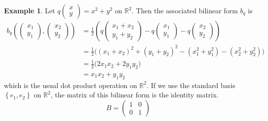 \documentclass[12pt]{article}
\theoremstyle{definition}
\newtheorem{example}[theorem]{Example}
\newcommand{\R}{\mathbb{R}}
\newcommand{\lp}{\left(}
\newcommand{\rp}{\right)}
\newcommand{\lb}{\left\{}
\newcommand{\rb}{\right\}}
\begin{document}
\begin{example}
Let $q \begin{pmatrix} x \\ y \end{pmatrix} = x^2+ y^2$ on $\R^2$. Then the associated bilinear form $b_q$ is
\begin{align*}
	b_q \lp
	\begin{pmatrix}
		x_1 \\
		y_1
	\end{pmatrix}
	,
	\begin{pmatrix}
		x_2 \\
		y_2
	\end{pmatrix}
	\rp  &= \frac 12 \lp
	q 
	\begin{pmatrix}
		x_1 + x_2 \\
		y_1 + y_2
	\end{pmatrix}
	-
	q 
	\begin{pmatrix}
		x_1 \\
		y_1
	\end{pmatrix} 
	-
	q 
	\begin{pmatrix}
		x_2 \\
		y_2
	\end{pmatrix}
	\rp \\
	&= \frac 12 \Big( (x_1+x_2)^2 + (y_1 + y_2)^2 - (x_1^2 + y_1^2) - (x_2^2 + y_2^2) \Big) \\
	&= \frac 12 \Big( 2x_1 x_2 + 2y_1 y_2 \Big) \\
	&= x_1 x_2 + y_1 y_2
\end{align*}
which is the usual dot product operation on $\R^2$. If we use the standard basis $\lb e_1, e_2 \rb$ on $\R^2$, the matrix of this bilinear form is the identity matrix.
\[
	B =
	\begin{pmatrix}
		1 & 0 \\
		0 & 1
	\end{pmatrix}
\]
\end{example}
\end{document}

